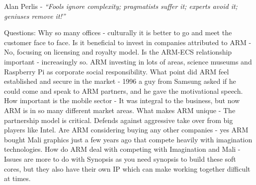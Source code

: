 Alan Perlis - \emph{``Fools ignore complexity; pragmatists suffer it; experts avoid it; geniuses remove it!''}

Questions:
Why so many offices - culturally it is better to go and meet the customer face to  face.
Is it beneficial to invest in companies attributed to ARM - No, focusing on licensing and royalty model.
Is the ARM-ECS relationship important - increasingly so. ARM investing in lots of areas, science museums and Raspberry Pi as corporate social responsibility.
What point did ARM feel established and secure in the market - 1996 a guy from Samsung asked if he could come and speak to ARM partners, and he gave the motivational speech.
How important is the mobile sector - It was integral to the business, but now ARM is in so many different market areas.
What makes ARM unique - The partnership model is critical. Defends against aggressive take over from big players like Intel.
Are ARM considering buying any other companies - yes ARM bought Mali graphics just a few years ago that compete heavily with imagination technologies.
How do ARM deal with competing with Imagination and Mali - Issues are more to do with Synopsis as you need synopsis to build these soft cores, but they also have their own IP which can make working together difficult at times.
